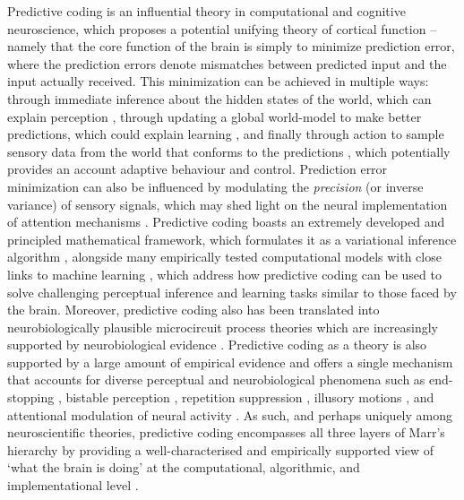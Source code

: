 Predictive coding is an influential theory in computational and cognitive neuroscience, which proposes a potential unifying theory of cortical function \citep{friston2003learning,friston2005theory,rao1999predictive,friston2010free,clark2013whatever,seth2014cybernetic} -- namely that the core function of the brain is simply to minimize prediction error, where the prediction errors denote mismatches between predicted input and the input actually received. This minimization can be achieved in multiple ways: through immediate inference about the hidden states of the world, which can explain perception \citep{beal2003variational}, through updating a global world-model to make better predictions, which could explain learning \citep{friston2003learning,neal1998view}, and finally through action to sample sensory data from the world that conforms to the predictions \citep{friston2009reinforcement}, which potentially provides an account adaptive behaviour and control. Prediction error minimization can also be influenced by modulating the \emph{precision} (or inverse variance) of sensory signals, which may shed light on the neural implementation of attention mechanisms \citep{feldman2010attention,kanai2015cerebral}. Predictive coding boasts an extremely developed and principled mathematical framework, which formulates it as a variational inference algorithm \citep{blei2017variational,ghahramani2000graphical, jordan1998introduction}, alongside many empirically tested computational models with close links to machine learning \citep{beal2003variational,dayan1995helmholtz,hinton1994autoencoders}, which address how predictive coding can be used to solve challenging perceptual inference and learning tasks similar to those faced by the brain. Moreover, predictive coding also has been translated into neurobiologically plausible microcircuit process theories \citep{bastos2012canonical,shipp2016neural,shipp2013reflections} which are increasingly supported by neurobiological evidence \citep{walsh2020evaluating}. Predictive coding as a theory is also supported by a large amount of empirical evidence and offers a single mechanism that accounts for diverse perceptual and neurobiological phenomena such as end-stopping \citep{rao1999predictive}, bistable perception \citep{hohwy2008predictive,weilnhammer2017predictive}, repetition suppression \citep{auksztulewicz2016repetition}, illusory motions \citep{lotter2016deep,watanabe2018illusory}, and attentional modulation of neural activity \citep{feldman2010attention,kanai2015cerebral}. As such, and perhaps uniquely among neuroscientific theories, predictive coding encompasses all three layers of Marr's hierarchy by providing a well-characterised and empirically supported view of `what the brain is doing' at the computational, algorithmic, and implementational level \citep{marr1982vision}.

